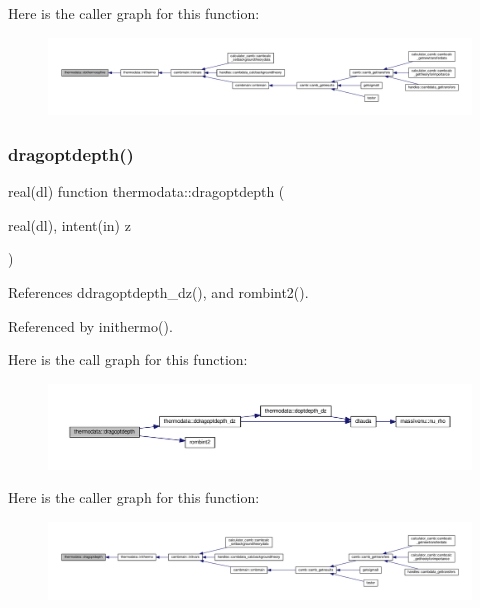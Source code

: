 Here is the caller graph for this function\+:
\nopagebreak
\begin{figure}[H]
\begin{center}
\leavevmode
\includegraphics[width=350pt]{namespacethermodata_a1c7e7a0884bd2117c1d24a1ce8d5aaf1_icgraph}
\end{center}
\end{figure}
\mbox{\label{namespacethermodata_ac14b857825ae37eee1107a320f7d71f7}} 
\subsubsection{\texorpdfstring{dragoptdepth()}{dragoptdepth()}}
{\footnotesize\ttfamily real(dl) function thermodata\+::dragoptdepth (\begin{DoxyParamCaption}\item[{real(dl), intent(in)}]{z }\end{DoxyParamCaption})\hspace{0.3cm}{\ttfamily [private]}}



References ddragoptdepth\+\_\+dz(), and rombint2().



Referenced by inithermo().

Here is the call graph for this function\+:
\nopagebreak
\begin{figure}[H]
\begin{center}
\leavevmode
\includegraphics[width=350pt]{namespacethermodata_ac14b857825ae37eee1107a320f7d71f7_cgraph}
\end{center}
\end{figure}
Here is the caller graph for this function\+:
\nopagebreak
\begin{figure}[H]
\begin{center}
\leavevmode
\includegraphics[width=350pt]{namespacethermodata_ac14b857825ae37eee1107a320f7d71f7_icgraph}
\end{center}
\end{figure}
\mbox{\label{namespacethermodata_a402bcd30314032d575f841bf374ad320}} 
